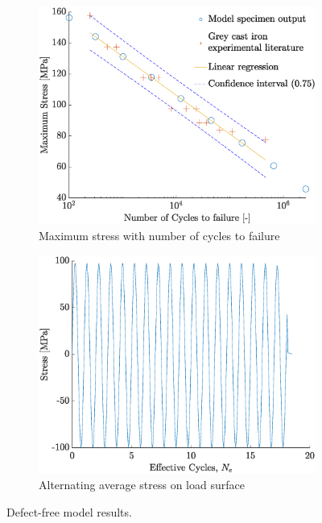 \documentclass[11pt,a4paper]{article}
\begin{document}
\begin{figure} [ht]
\begin{subfigure}{0.52\textwidth}
\includegraphics[scale=0.4, center]{model.eps}
\caption{Maximum stress with number of cycles to failure}
\label{model specimen S-N}
\end{subfigure}
\begin{subfigure}{0.57\textwidth}
\includegraphics[scale=0.4, center]{model_stress.eps}
\caption{Alternating average stress on load surface}
\label{alternating stress model specimen}
\end{subfigure}
\caption{Defect-free model results.}
\end{figure}
\end{document}
